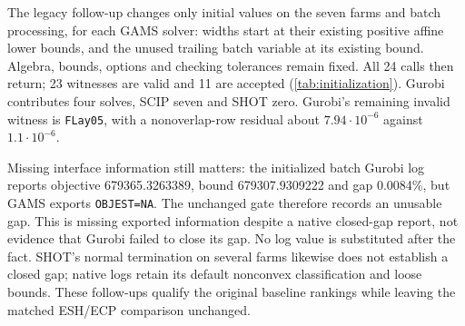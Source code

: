 The legacy follow-up changes only initial values on the seven farms and batch processing, for each GAMS solver: widths start at their existing positive affine lower bounds, and the unused trailing batch variable at its existing bound. Algebra, bounds, options and checking tolerances remain fixed. All 24 calls then return; 23 witnesses are valid and 11 are accepted (\cref{tab:initialization}). Gurobi contributes four solves, SCIP seven and SHOT zero. Gurobi's remaining invalid witness is \texttt{FLay05}, with a nonoverlap-row residual about $7.94\cdot10^{-6}$ against $1.1\cdot10^{-6}$.

Missing interface information still matters: the initialized batch Gurobi log reports objective 679365.3263389, bound 679307.9309222 and gap 0.0084\%, but GAMS exports \texttt{OBJEST=NA}. The unchanged gate therefore records an unusable gap. This is missing exported information despite a native closed-gap report, not evidence that Gurobi failed to close its gap. No log value is substituted after the fact. SHOT's normal termination on several farms likewise does not establish a closed gap; native logs retain its default nonconvex classification and loose bounds. These follow-ups qualify the original baseline rankings while leaving the matched ESH/ECP comparison unchanged.
